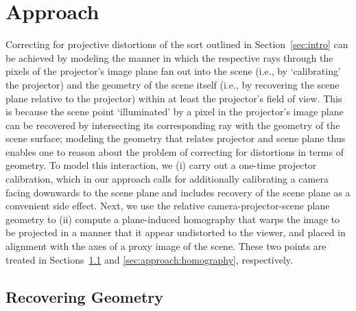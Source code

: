 \documentclass[review]{elsarticle}
\begin{document}
\section{Approach}

Correcting for projective distortions of the sort outlined in Section~\ref{sec:intro} can be achieved by modeling the manner in which the respective rays through the pixels of the projector's image plane fan out into the scene (i.e., by `calibrating' the projector) and the geometry of the scene itself (i.e., by recovering the scene plane relative to the projector) within at least the projector's field of view. This is because the scene point `illuminated' by a pixel in the projector's image plane can be recovered by intersecting its corresponding ray with the geometry of the scene surface; modeling the geometry that relates projector and scene plane thus enables one to reason about the problem of correcting for distortions in terms of geometry. To model this interaction, we (i) carry out a one-time projector calibration, which in our approach calls for additionally calibrating a camera facing downwards to the scene plane and includes recovery of the scene plane as a convenient side effect. Next, we use the relative camera-projector-scene plane geometry to (ii) compute a plane-induced homography that warps the image to be projected in a manner that it appear undistorted to the viewer, and placed in alignment with the axes of a proxy image of the scene. These two points are treated in Sections~\ref{sec:approach:geometry} and \ref{sec:approach:homography}, respectively.

\subsection{Recovering Geometry}\label{sec:approach:geometry}
\end{document}
